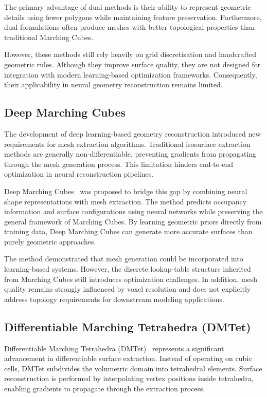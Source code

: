 \documentclass[../main.tex]{subfiles}
\begin{document}
The primary advantage of dual methods is their ability to represent geometric details using fewer polygons while maintaining feature preservation. Furthermore, dual formulations often produce meshes with better topological properties than traditional Marching Cubes.

However, these methods still rely heavily on grid discretization and handcrafted geometric rules. Although they improve surface quality, they are not designed for integration with modern learning-based optimization frameworks. Consequently, their applicability in neural geometry reconstruction remains limited.

\subsection{Deep Marching Cubes}

The development of deep learning-based geometry reconstruction introduced new requirements for mesh extraction algorithms. Traditional isosurface extraction methods are generally non-differentiable, preventing gradients from propagating through the mesh generation process. This limitation hinders end-to-end optimization in neural reconstruction pipelines.

Deep Marching Cubes~\cite{liao2018deepmc} was proposed to bridge this gap by combining neural shape representations with mesh extraction. The method predicts occupancy information and surface configurations using neural networks while preserving the general framework of Marching Cubes. By learning geometric priors directly from training data, Deep Marching Cubes can generate more accurate surfaces than purely geometric approaches.

The method demonstrated that mesh generation could be incorporated into learning-based systems. However, the discrete lookup-table structure inherited from Marching Cubes still introduces optimization challenges. In addition, mesh quality remains strongly influenced by voxel resolution and does not explicitly address topology requirements for downstream modeling applications.

\subsection{Differentiable Marching Tetrahedra (DMTet)}

Differentiable Marching Tetrahedra (DMTet)~\cite{shen2021dmtet} represents a significant advancement in differentiable surface extraction. Instead of operating on cubic cells, DMTet subdivides the volumetric domain into tetrahedral elements. Surface reconstruction is performed by interpolating vertex positions inside tetrahedra, enabling gradients to propagate through the extraction process.
\end{document}
